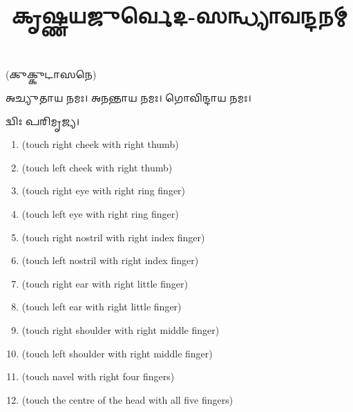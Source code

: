 \setmainfont[Scale=0.50,Script=Grantha,Mapping=tex-text,Mapping=devanagarinumerals,AutoFakeBold=2.0]{Noto Serif Grantha}
\title{\Huge 𑌕𑍃𑌷𑍍𑌣𑌯𑌜𑍁𑌰𑍍𑌵𑍇𑌦-𑌸𑌨𑍍𑌧𑍍𑌯𑌾𑌵𑌨𑍍𑌦𑌨𑌮𑍍}
\date{}
\maketitle
\tableofcontents 

\clearpage
{}
\renewcommand{\sectionmark}[1]{%
\markboth{\large #1 (𑌪𑍍𑌰𑌾𑌤𑌃 𑌸𑌨𑍍𑌧𑍍𑌯𑌾)}{}}

(𑌕𑍁𑌕𑍍𑌕𑍁𑌟𑌾𑌸𑌨𑍇)

𑌅𑌚𑍍𑌯𑍁𑌤𑌾𑌯 𑌨𑌮𑌃। 𑌅𑌨𑌨𑍍𑌤𑌾𑌯 𑌨𑌮𑌃। 𑌗𑍋𑌵𑌿𑌨𑍍𑌦𑌾𑌯 𑌨𑌮𑌃। 

𑌦𑍍𑌵𑌿𑌃 𑌪𑌰𑌿𑌮𑍃𑌜𑍍𑌯।


\begin{enumerate}
    \item {} {\scriptsize (touch right cheek with right thumb)}
    \item {} {\scriptsize (touch left cheek with right thumb)}
    \item {} {\scriptsize (touch right eye with right ring finger)}
    \item {} {\scriptsize (touch left eye with right ring finger)}
    \item {} {\scriptsize (touch right nostril with right index finger)}
    \item {} {\scriptsize (touch left nostril with right index finger)}
    \item {} {\scriptsize (touch right ear with right little finger)}
    \item {} {\scriptsize (touch left ear with right little finger)}
    \item {} {\scriptsize (touch right shoulder with right middle finger)}
    \item {} {\scriptsize (touch left shoulder with right middle finger)}
    \item {} {\scriptsize (touch navel with right four fingers)}
    \item {} {\scriptsize (touch the centre of the head with all five fingers)}
\end{enumerate}


